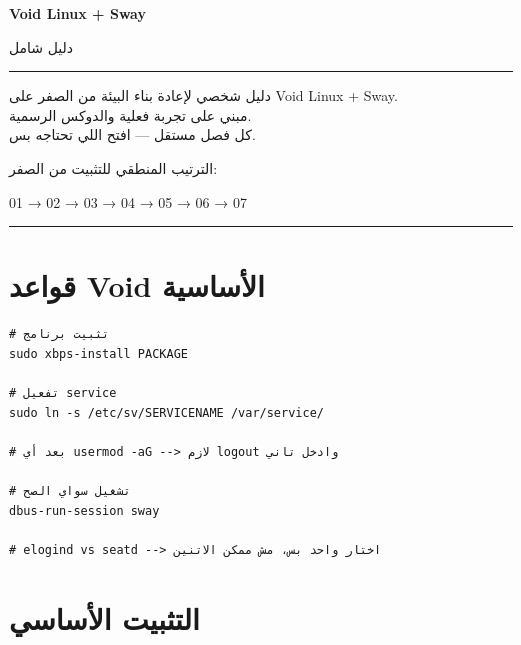 \documentclass[12pt, a4paper]{report}
\begin{document}
\pagecolor{codebg}
\color{codefg}

\begin{titlepage}
  \centering
  \vspace*{3cm}
  {\Huge\bfseries\color{accent} Void Linux + Sway\par}
  \vspace{1cm}
  {\huge\color{white} دليل شامل\par}
  \vspace{1cm}
  \rule{0.5\textwidth}{0.5pt}
  \vspace{1cm}
  \par
  {\large\color{codefg!80!white}
  دليل شخصي لإعادة بناء البيئة من الصفر على Void Linux + Sway.\\[0.4em]
  مبني على تجربة فعلية والدوكس الرسمية.\\[0.4em]
  كل فصل مستقل --- افتح اللي تحتاجه بس.
  \par}
  \vspace{2cm}
  {\large\color{rulecolor} الترتيب المنطقي للتثبيت من الصفر:\par}
  \vspace{0.5cm}
  {\large\color{accent!80!white}
  01 → 02 → 03 → 04 → 05 → 06 → 07\par}
  \vfill
  \rule{0.4\textwidth}{0.3pt}
\end{titlepage}

\tableofcontents
\clearpage

\chapter*{قواعد Void الأساسية}

\begin{lstlisting}
# تثبيت برنامج
sudo xbps-install PACKAGE

# تفعيل service
sudo ln -s /etc/sv/SERVICENAME /var/service/

# بعد أي usermod -aG --> لازم logout وادخل تاني

# تشغيل سواي الصح
dbus-run-session sway

# elogind vs seatd --> اختار واحد بس، مش ممكن الاتنين
\end{lstlisting}

\chapter{التثبيت الأساسي}
\end{document}
